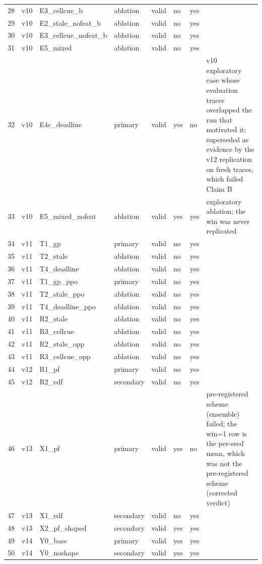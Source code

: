 \documentclass[10pt]{article}
\begin{document}
\begin{landscape}
\begin{longtable}{@{}llllllll@{}}
28 & v10 & E3\_cellcue\_b & ablation & valid & no & yes &  \\
29 & v10 & E2\_stale\_nofeat\_b & ablation & valid & no & yes &  \\
30 & v10 & E3\_cellcue\_nofeat\_b & ablation & valid & no & yes &  \\
31 & v10 & E5\_mixed & ablation & valid & no & yes &  \\
32 & v10 & E4c\_deadline & primary & valid & yes & no & v10 exploratory case whose evaluation traces overlapped the run that motivated it; superseded as evidence by the v12 replication on fresh traces, which failed Claim B \\
33 & v10 & E5\_mixed\_nofeat & ablation & valid & yes & yes & exploratory ablation; the win was never replicated \\
34 & v11 & T1\_gp & primary & valid & no & yes &  \\
35 & v11 & T2\_stale & ablation & valid & no & yes &  \\
36 & v11 & T4\_deadline & ablation & valid & no & yes &  \\
37 & v11 & T1\_gp\_ppo & primary & valid & no & yes &  \\
38 & v11 & T2\_stale\_ppo & ablation & valid & no & yes &  \\
39 & v11 & T4\_deadline\_ppo & ablation & valid & no & yes &  \\
40 & v11 & R2\_stale & ablation & valid & no & yes &  \\
41 & v11 & R3\_cellcue & ablation & valid & no & yes &  \\
42 & v11 & R2\_stale\_opp & ablation & valid & no & yes &  \\
43 & v11 & R3\_cellcue\_opp & ablation & valid & no & yes &  \\
44 & v12 & R1\_pf & primary & valid & no & yes &  \\
45 & v12 & R2\_edf & secondary & valid & no & yes &  \\
46 & v13 & X1\_pf & primary & valid & yes & no & pre-registered scheme (ensemble) failed; the win=1 row is the per-seed mean, which was not the pre-registered scheme (corrected verdict) \\
47 & v13 & X1\_edf & secondary & valid & no & yes &  \\
48 & v13 & X2\_pf\_shaped & secondary & valid & yes & yes &  \\
49 & v14 & Y0\_base & primary & valid & yes & yes &  \\
50 & v14 & Y0\_noshape & secondary & valid & yes & yes &  \\

\end{longtable}
\end{landscape}
\end{document}
